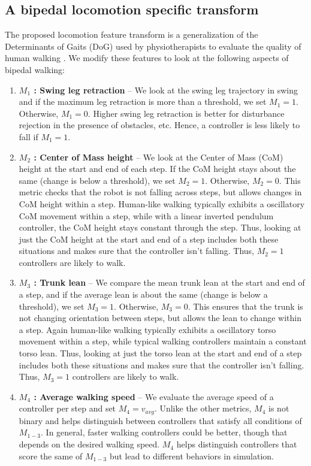 \subsection{A bipedal locomotion specific transform}

The proposed locomotion feature transform is a generalization of the Determinants of Gaits (DoG) used by physiotherapists to evaluate the quality of human walking \citep{inman1953major}. We modify these features to look at the following aspects of bipedal walking:

\begin{enumerate}
    \item {\bf{$M_1$ : Swing leg retraction}} -- We look at the swing leg trajectory in swing and if the maximum leg retraction is more than a threshold, we set $M_1 = 1$. Otherwise, $M_1 = 0$. Higher swing leg retraction is better for disturbance rejection in the presence of obstacles, etc. Hence, a controller is less likely to fall if $M_1 = 1$.
    
    \item {\bf{$M_2$ : Center of Mass height}} -- We look at the Center of Mass (CoM) height at the start and end of each step. If the CoM height stays about the same (change is below a threshold), we set $M_2 = 1$. Otherwise, $M_2 = 0$. This metric checks that the robot is not falling across steps, but allows changes in CoM height within a step. Human-like walking typically exhibits a oscillatory CoM movement within a step, while with a linear inverted pendulum controller, the CoM height stays constant through the step. Thus, looking at just the CoM height at the start and end of a step includes both these situations and makes sure that the controller isn't falling. Thus, $M_2 = 1$ controllers are likely to walk.
    
    \item {\bf{$M_3$ : Trunk lean}} -- We compare the mean trunk lean at the start and end of a step, and if the average lean is about the same (change is below a threshold), we set $M_3 = 1$. Otherwise, $M_3 = 0$. This ensures that the trunk is not changing orientation between steps, but allows the lean to change within a step. Again human-like walking typically exhibits a oscillatory torso movement within a step, while typical walking controllers maintain a constant torso lean. Thus, looking at just the torso lean at the start and end of a step includes both these situations and makes sure that the controller isn't falling. Thus, $M_3 = 1$ controllers are likely to walk.
    
    
    \item {\bf{$M_4$ : Average walking speed}} -- We evaluate the average speed of a controller per step and set $M_4 = v_{avg}$. Unlike the other metrics, $M_4$ is not binary and helps distinguish between controllers that satisfy all conditions of $M_{1-3}$. In general, faster walking controllers could be better, though that depends on the desired walking speed. $M_4$ helps distinguish controllers that score the same of $M_{1-3}$ but lead to different behaviors in simulation.
    
\end{enumerate}

